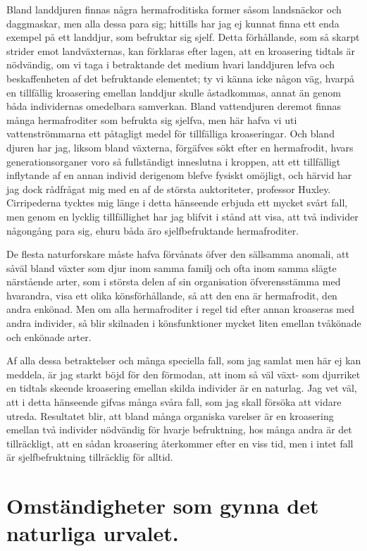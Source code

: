 Bland landdjuren finnas några hermafroditiska former såsom landsnäckor och daggmaskar, men alla dessa para sig; hittills har jag ej kunnat finna ett enda exempel på ett landdjur, som befruktar sig sjelf. Detta förhållande, som så skarpt strider emot landväxternas, kan förklaras efter lagen, att en kroasering tidtals är nödvändig, om vi taga i betraktande det medium hvari landdjuren lefva och beskaffenheten af det befruktande elementet; ty vi känna icke någon väg, hvarpå en tillfällig kroasering emellan landdjur skulle åstadkommas, annat än genom båda individernas omedelbara samverkan. Bland vattendjuren deremot finnas många hermafroditer som befrukta sig sjelfva, men här hafva vi uti vattenströmmarna ett påtagligt medel för tillfälliga kroaseringar. Och bland djuren har jag, liksom bland växterna, förgäfves sökt efter en hermafrodit, hvars generationsorganer voro så fullständigt inneslutna i kroppen, att ett tillfälligt inflytande af en annan individ derigenom blefve fysiskt omöjligt, och härvid har jag dock rådfrågat mig med en af de största auktoriteter, professor Huxley. Cirripederna tycktes mig länge i detta hänseende erbjuda ett mycket svårt fall, men genom en lycklig tillfällighet har jag blifvit i stånd att visa, att två individer någongång para sig, ehuru båda äro sjelfbefruktande hermafroditer.

De flesta naturforskare måste hafva förvånats öfver den sällsamma anomali, att såväl bland växter som djur inom samma familj och ofta inom samma slägte närstående arter, som i största delen af sin organisation öfverensstämma med hvarandra, visa ett olika könsförhållande, så att den ena är hermafrodit, den andra enkönad. Men om alla hermafroditer i regel tid efter annan kroaseras med andra individer, så blir skilnaden i könsfunktioner mycket liten emellan tvåkönade och enkönade arter.

Af alla dessa betraktelser och många speciella fall, som jag samlat men här ej kan meddela, är jag starkt böjd för den förmodan, att inom så väl växt- som djurriket en tidtals skeende kroasering emellan skilda individer är en naturlag. Jag vet väl, att i detta hänseende gifvas många svåra fall, som jag skall försöka att vidare utreda. Resultatet blir, att bland många organiska varelser är en kroasering emellan två individer nödvändig för hvarje befruktning, hos många andra är det tillräckligt, att en sådan kroasering återkommer efter en viss tid, men i intet fall är sjelfbefruktning tillräcklig för alltid.



\section[Gynnande Omständigheter]{Omständigheter som gynna det naturliga urvalet.}

